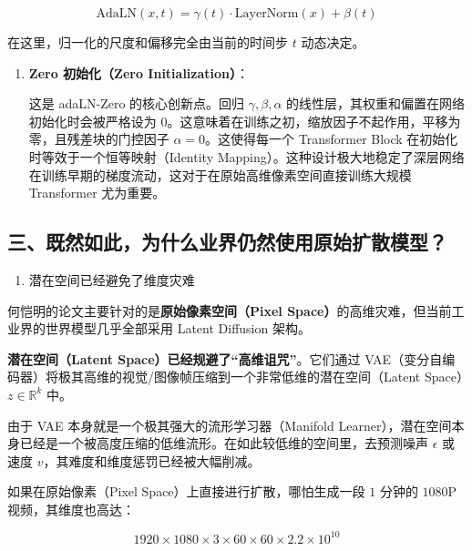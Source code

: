 \[
\mathrm{AdaLN}(x,t)=\gamma(t)\cdot\mathrm{LayerNorm}(x)+\beta(t)
\]

在这里，归一化的尺度和偏移完全由当前的时间步 \(t\) 动态决定。

\begin{enumerate}
\def\labelenumi{\arabic{enumi}.}
\setcounter{enumi}{3}
\item
  \textbf{Zero 初始化（Zero Initialization）}：

  这是 adaLN-Zero 的核心创新点。回归 \(\gamma,\beta,\alpha\) 的线性层，其权重和偏置在网络初始化时会被严格设为 \(0\)。这意味着在训练之初，缩放因子不起作用，平移为零，且残差块的门控因子 \(\alpha=0\)。这使得每一个 Transformer Block 在初始化时等效于一个恒等映射（Identity Mapping）。这种设计极大地稳定了深层网络在训练早期的梯度流动，这对于在原始高维像素空间直接训练大规模 Transformer 尤为重要。
\end{enumerate}

\hypertarget{ux4e09ux65e2ux7136ux5982ux6b64ux4e3aux4ec0ux4e48ux4e1aux754cux4ecdux7136ux4f7fux7528ux539fux59cbux6269ux6563ux6a21ux578b}{%
\subsection{三、既然如此，为什么业界仍然使用原始扩散模型？}\label{ux4e09ux65e2ux7136ux5982ux6b64ux4e3aux4ec0ux4e48ux4e1aux754cux4ecdux7136ux4f7fux7528ux539fux59cbux6269ux6563ux6a21ux578b}}

\begin{enumerate}
\def\labelenumi{\arabic{enumi}.}
\tightlist
\item
  潜在空间已经避免了维度灾难
\end{enumerate}

何恺明的论文主要针对的是\textbf{原始像素空间（Pixel Space）}的高维灾难，但当前工业界的世界模型几乎全部采用 Latent Diffusion 架构。

\textbf{潜在空间（Latent Space）已经规避了``高维诅咒''}。它们通过 VAE（变分自编码器）将极其高维的视觉/图像帧压缩到一个非常低维的潜在空间（Latent Space）\(z\in\mathbb{R}^k\) 中。

由于 VAE 本身就是一个极其强大的流形学习器（Manifold Learner），潜在空间本身已经是一个被高度压缩的低维流形。在如此较低维的空间里，去预测噪声 \(\epsilon\) 或速度 \(v\)，其难度和维度惩罚已经被大幅削减。

如果在原始像素（Pixel Space）上直接进行扩散，哪怕生成一段 \(1\) 分钟的 \(1080\)P 视频，其维度也高达：

\[
1920\times1080\times3\times60\times60\times2.2\times10^{10}
\]

